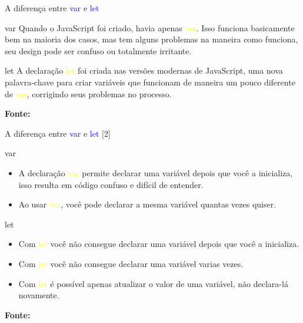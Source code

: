 \documentclass{beamer}
\begin{document}
    \begin{frame}{A diferença entre \textcolor{blue}{var} e \textcolor{blue}{let}}
    \begin{block}{var}
    Quando o JavaScript foi criado, havia apenas \textcolor{yellow}{var}. Isso funciona basicamente bem na maioria dos casos, mas tem alguns problemas na maneira como funciona, seu design pode ser confuso ou totalmente irritante.
    \end{block}
    
    \begin{block}{let}
    A declaração \textcolor{yellow}{let} foi criada nas versões modernas de JavaScript, uma nova palavra-chave para criar variáveis que funcionam de maneira um pouco diferente de \textcolor{yellow}{var}, corrigindo seus problemas no processo.
    \end{block}
    \centering
    \tiny{\textbf{Fonte:} \cite{moziladev2022js}}
    \end{frame}
    
    \begin{frame}{A diferença entre \textcolor{blue}{var} e \textcolor{blue}{let} [2]}
    \begin{block}{var}
    \begin{itemize}
        \item A declaração \textcolor{yellow}{var} permite declarar uma variável depois que você a inicializa, isso resulta em código confuso e difícil de entender.
        \item Ao usar \textcolor{yellow}{var}, você pode declarar a mesma variável quantas vezes quiser. 
    \end{itemize}
    \end{block}
    
    \begin{block}{let}
    \begin{itemize}
        \item Com \textcolor{yellow}{let} você não consegue declarar uma variável depois que você a inicializa. 
        \item Com \textcolor{yellow}{let} você não consegue declarar uma variável varias vezes. 
        \item Com \textcolor{yellow}{let} é possível apenas atualizar o valor de uma variável, não declara-lá novamente.
    \end{itemize}
    \end{block}
    \centering
    \tiny{\textbf{Fonte:} \cite{moziladev2022js}}
    \end{frame}
\end{document}
